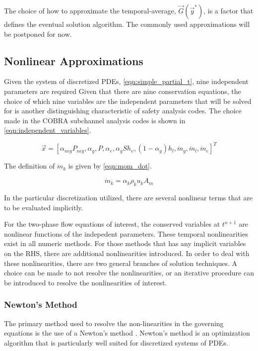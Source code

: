 The choice of how to approximate the temporal-average, $\vec{G}(\vec{y}^{*})$, is a factor that defines the eventual solution algorithm.
The commonly used approximations will be postponed for now. 

\subsection{Nonlinear Approximations}
\label{sect:nonlinear_approximations}

Given the system of discretized PDEs, \eqref{eqn:simple_partial_t}, nine independent parameters are required
Given that there are nine conservation equations, the choice of which nine variables are the independent parameters that will be solved for is another distinguishing characteristic of safety analysis codes.
The choice made in the COBRA subchannel analysis codes is shown in \eqref{eqn:independent_variables}.

\begin{equation}
\label{eqn:independent_variables}
\vec{x} = [\alpha_{ncg}P_{ncg}, \alpha_g, P, \alpha_e, \alpha_gS h_v, (1 - \alpha_g) h_l, \dot{m}_g, \dot{m}_l, \dot{m}_e]^{T}
\end{equation}

The definition of $\dot{m}_k$ is given by \eqref{eqn:mom_dot}.

\begin{equation}
\label{eqn:mom_dot}
\dot{m}_k = \alpha_k \rho_k u_k A_m
\end{equation}

In the particular discretization utilized, there are several nonlinear terms that are to be evaluated implicitly.

For the two-phase flow equations of interest, the conserved variables at $t^{n+1}$ are nonlinear functions of the indepedent parameters.
These temporal nonlinearities exist in all numeric methods.
For those methods that has any implicit variables on the RHS, there are additional nonlinearities introduced.
In order to deal with these nonlinearities, there are two general branches of solution techniques.
A choice can be made to not resolve the nonlinearities, or an iterative procedure can be introduced to resolve the nonlinearities of interest.

\subsubsection{Newton's Method}
\label{subsubsect:newtons_method}
The primary method used to resolve the non-linearities in the governing equations is the use of a Newton's method \cite{Deuflhard2004}.
Newton's method is an optimization algorithm that is particularly well suited for discretized systems of PDEs.

